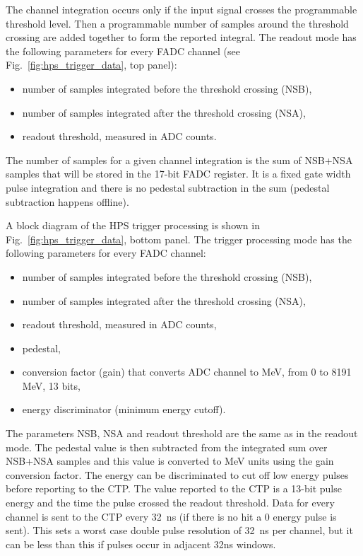 The channel integration occurs only if the input signal crosses the programmable threshold level.  
Then a programmable number of samples around the threshold crossing are added together to form the 
reported integral.  The readout  mode has the following parameters for every FADC channel (see 
Fig.~\ref{fig:hps_trigger_data}, top panel):
 \begin{itemize}
 \item number of samples integrated before the threshold crossing (NSB), 
 \item number of samples integrated after the  threshold crossing (NSA),
 \item readout threshold, measured in ADC counts.
 \end{itemize}
The number of samples for a given channel integration is the sum of NSB+NSA samples that will be stored in  
 the 17-bit FADC register. It is a fixed gate width pulse integration and there is no pedestal subtraction in the 
 sum (pedestal subtraction happens offline).
 

 


A block diagram of the HPS  trigger processing is shown in Fig.~\ref{fig:hps_trigger_data}, bottom panel. 
The trigger processing mode has the following parameters for every FADC channel:
 \begin{itemize}
 \item number of samples integrated before the threshold crossing (NSB),
 \item number of samples integrated after the  threshold crossing (NSA),
 \item readout threshold, measured in ADC counts, 
 \item pedestal, 
 \item conversion factor (gain) that converts  ADC channel to MeV, from 0 to 8191 MeV, 13 bits, 
 \item energy discriminator (minimum energy cutoff).
 \end{itemize}
The parameters NSB, NSA and readout threshold are the same as in the readout mode.
The pedestal value is then subtracted from the integrated sum over NSB+NSA samples and this value is 
converted to MeV units using the gain conversion factor. The energy can be discriminated to cut off low 
energy pulses before reporting to the CTP. 
The value reported to the CTP is a 13-bit pulse energy and the time the pulse crossed the readout threshold. 
Data for every channel is sent to the CTP every 32~ns (if there is no hit a 0 energy pulse is sent). 
This sets a worst case double pulse resolution of 32~ns per channel, but it can be less than this if pulses occur in adjacent 32ns windows.


